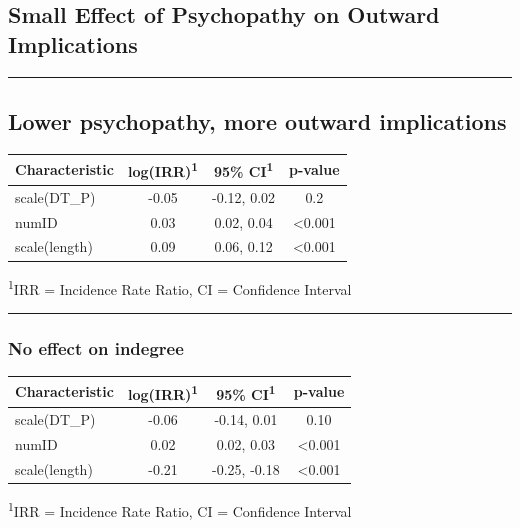 \documentclass[
  .7em,
  letterpaper,
  DIV=11,
  numbers=noendperiod]{scrartcl}
\begin{document}
\hypertarget{small-effect-of-psychopathy-on-outward-implications}{%
\subsection{Small Effect of Psychopathy on Outward
Implications}\label{small-effect-of-psychopathy-on-outward-implications}}

\begin{center}\rule{0.5\linewidth}{0.5pt}\end{center}

\hypertarget{lower-psychopathy-more-outward-implications}{%
\subsection{Lower psychopathy, more outward
implications}\label{lower-psychopathy-more-outward-implications}}

\captionsetup[table]{labelformat=empty,skip=1pt}
\setlength{\LTpost}{0mm}
\begin{longtable}{lccc}
\toprule
\textbf{Characteristic} & \textbf{log(IRR)}\textsuperscript{1} & \textbf{95\% CI}\textsuperscript{1} & \textbf{p-value} \\ 
\midrule
scale(DT\_P) & -0.05 & -0.12, 0.02 & 0.2 \\ 
numID & 0.03 & 0.02, 0.04 & <0.001 \\ 
scale(length) & 0.09 & 0.06, 0.12 & <0.001 \\ 
\bottomrule
\end{longtable}
\begin{minipage}{\linewidth}
\textsuperscript{1}IRR = Incidence Rate Ratio, CI = Confidence Interval\\
\end{minipage}

\begin{center}\rule{0.5\linewidth}{0.5pt}\end{center}

\hypertarget{no-effect-on-indegree-4}{%
\subsubsection{No effect on indegree}\label{no-effect-on-indegree-4}}

\captionsetup[table]{labelformat=empty,skip=1pt}
\setlength{\LTpost}{0mm}
\begin{longtable}{lccc}
\toprule
\textbf{Characteristic} & \textbf{log(IRR)}\textsuperscript{1} & \textbf{95\% CI}\textsuperscript{1} & \textbf{p-value} \\ 
\midrule
scale(DT\_P) & -0.06 & -0.14, 0.01 & 0.10 \\ 
numID & 0.02 & 0.02, 0.03 & <0.001 \\ 
scale(length) & -0.21 & -0.25, -0.18 & <0.001 \\ 
\bottomrule
\end{longtable}
\begin{minipage}{\linewidth}
\textsuperscript{1}IRR = Incidence Rate Ratio, CI = Confidence Interval\\
\end{minipage}
\end{document}
